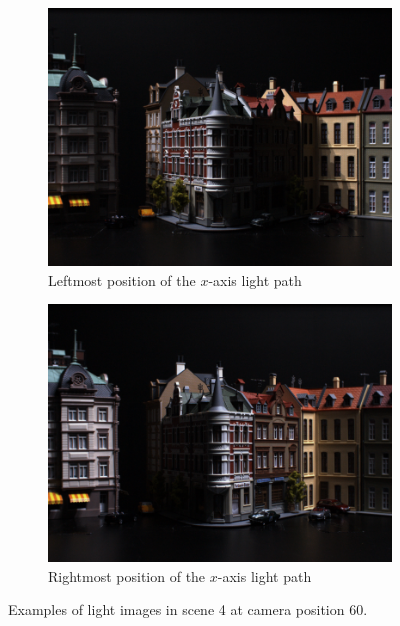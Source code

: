 \documentclass[thesis.tex]{subfiles}
\begin{document}
\begin{figure}[tb]
\begin{subfigure}[t]{0.32\textwidth}
		\includegraphics[width=\textwidth]{img/scene_04_img60_28.png}
		\caption{Leftmost position of the $x$-axis light path}
		\label{fig:light_example_28}
	\end{subfigure}
	\begin{subfigure}[t]{0.32\textwidth}
		\includegraphics[width=\textwidth]{img/scene_04_img60_20.png}
		\caption{Rightmost position of the $x$-axis light path}
		\label{fig:light_example_20}
	\end{subfigure}
	\caption{Examples of light images in scene 4 at camera position 60.}
	\label{fig:light_example}
\end{figure}
%
\end{document}
